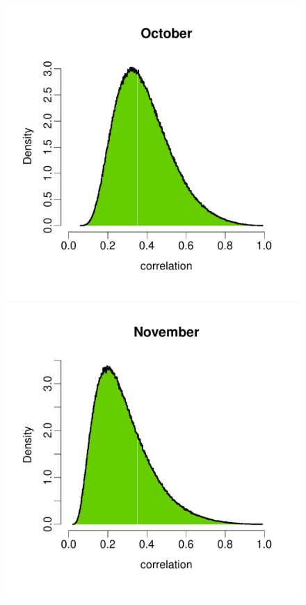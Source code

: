\documentclass[a4paper, 12pt]{article}
\begin{document}
\begin{figure}
 \includegraphics[width=\scale]{Validation_Plots/Correlation/Correlation_10_Oct}\hspace{-1ex}
 \includegraphics[width=\scale]{Validation_Plots/Correlation/Correlation_11_Nov}\hspace{-1ex}

\end{figure}
\end{document}
